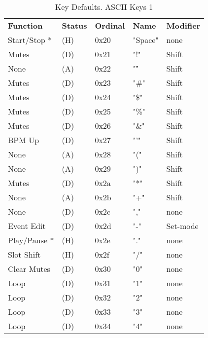    \begin{table}[htb!]
      \centering
      \caption{Key Defaults. ASCII Keys 1}
      \label{table:key_defaults_ascii_keys_1}
      \begin{tabular}{l l l l l}
        \textbf{Function} & \textbf{Status} & \textbf{Ordinal} & \textbf{Name} & \textbf{Modifier} \\
        Start/Stop *       & (H)  &  0x20   & "Space"      & none \\
        Mutes              & (D)  &  0x21   & "!"          & Shift \\
        None               & (A)  &  0x22   & "\""         & Shift \\
        Mutes              & (D)  &  0x23   & "\#"         & Shift \\
        Mutes              & (D)  &  0x24   & "\$"         & Shift \\
        Mutes              & (D)  &  0x25   & "\%"         & Shift \\
        Mutes              & (D)  &  0x26   & "\&"         & Shift \\
        BPM Up             & (D)  &  0x27   & "'"          & Shift \\
        None               & (A)  &  0x28   & "("          & Shift \\
        None               & (A)  &  0x29   & ")"          & Shift \\
        Mutes              & (D)  &  0x2a   & "*"          & Shift \\
        None               & (A)  &  0x2b   & "+"          & Shift \\
        None               & (D)  &  0x2c   & ","          & none \\
        Event Edit         & (D)  &  0x2d   & "-"          & Set-mode \\
        Play/Pause *       & (H)  &  0x2e   & "."          & none \\
        Slot Shift         & (H)  &  0x2f   & "/"          & none \\
        Clear Mutes        & (D)  &  0x30   & "0"          & none \\
        Loop               & (D)  &  0x31   & "1"          & none \\
        Loop               & (D)  &  0x32   & "2"          & none \\
        Loop               & (D)  &  0x33   & "3"          & none \\
        Loop               & (D)  &  0x34   & "4"          & none \\

\end{tabular}
\end{table}
